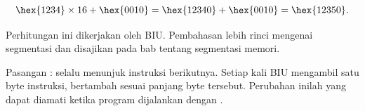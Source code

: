 \[
    \hex{1234} \times 16 + \hex{0010}
    = \hex{12340} + \hex{0010} = \hex{12350}.
\]

Perhitungan ini dikerjakan oleh BIU. Pembahasan lebih rinci mengenai
segmentasi dan  disajikan pada bab tentang
segmentasi memori.

\begin{infobox}
\vspace{1.1em}
Pasangan : selalu menunjuk instruksi berikutnya.
Setiap kali BIU mengambil satu byte instruksi,  bertambah
sesuai panjang byte tersebut. Perubahan  inilah yang dapat
diamati ketika program dijalankan dengan .
\end{infobox}
